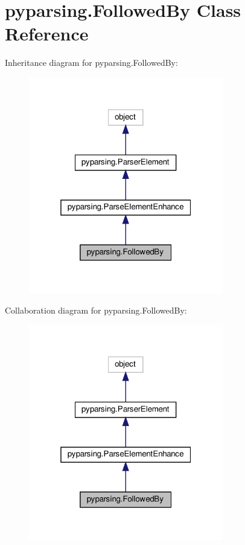 \hypertarget{classpyparsing_1_1FollowedBy}{}\section{pyparsing.\+Followed\+By Class Reference}
\label{classpyparsing_1_1FollowedBy}


Inheritance diagram for pyparsing.\+Followed\+By\+:
\nopagebreak
\begin{figure}[H]
\begin{center}
\leavevmode
\includegraphics[width=241pt]{classpyparsing_1_1FollowedBy__inherit__graph}
\end{center}
\end{figure}


Collaboration diagram for pyparsing.\+Followed\+By\+:
\nopagebreak
\begin{figure}[H]
\begin{center}
\leavevmode
\includegraphics[width=241pt]{classpyparsing_1_1FollowedBy__coll__graph}
\end{center}
\end{figure}
